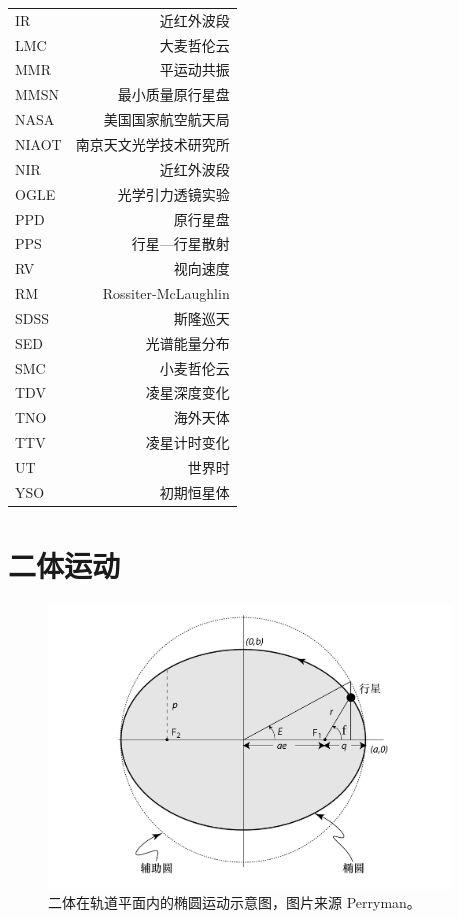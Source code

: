 \begin{multicols}{2}
\begin{tabularx}{0.85\linewidth}{@{\extracolsep{\fill}}lr}
\centering
IR			&   近红外波段				\\
LMC			&   大麦哲伦云				\\
MMR		&   平运动共振				\\   
MMSN		&   最小质量原行星盘		\\
NASA		&   美国国家航空航天局		\\
NIAOT		&   南京天文光学技术研究所	\\
NIR			&    近红外波段				\\
OGLE		&    光学引力透镜实验		\\
PPD			&    原行星盘				\\
PPS			&    行星---行星散射			\\
RV			&    视向速度				\\
RM 			&    Rossiter-McLaughlin 		\\
SDSS		&    斯隆巡天				\\
SED			&    光谱能量分布			\\
SMC			&    小麦哲伦云				\\
TDV			&    凌星深度变化			\\
TNO			&    海外天体				\\
TTV			&    凌星计时变化			\\
UT			&    世界时				\\
YSO			&    初期恒星体				\\


\end{tabularx}
\end{multicols}




\chapter{二体运动} \label{apdx:twobodyproblem}

\begin{figure}[h]
\centering
\includegraphics[width=0.95\textwidth]{figures/appendix/f1_ellipse.pdf}
\caption{二体在轨道平面内的椭圆运动示意图，图片来源 Perryman。}
\label{fig:ellipse}
\end{figure}

